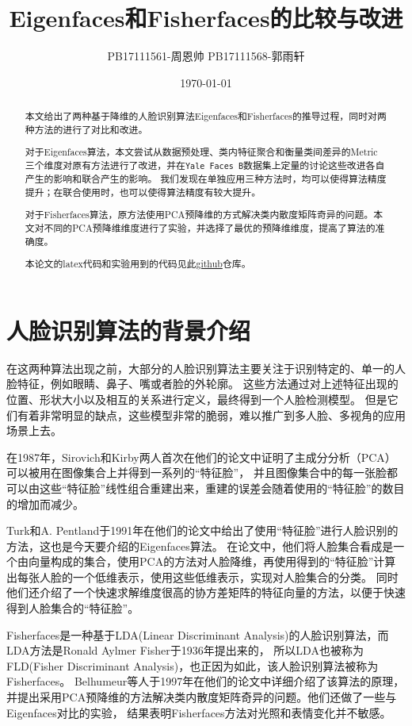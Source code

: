 \documentclass{ctexart}
\title{Eigenfaces和Fisherfaces的比较与改进}
\date{\today}
\author{PB17111561-周恩帅 PB17111568-郭雨轩}
\begin{document}
\maketitle

\begin{abstract}
    本文给出了两种基于降维的人脸识别算法Eigenfaces和Fisherfaces的推导过程，同时对两种方法的进行了对比和改进。
    
    对于Eigenfaces算法，本文尝试从数据预处理、类内特征聚合和衡量类间差异的Metric三个维度对原有方法进行了改进，并在\texttt{Yale Faces B}数据集上定量的讨论这些改进各自产生的影响和联合产生的影响。
    我们发现在单独应用三种方法时，均可以使得算法精度提升；在联合使用时，也可以使得算法精度有较大提升。
    
    对于Fisherfaces算法，原方法使用PCA预降维的方式解决类内散度矩阵奇异的问题。本文对不同的PCA预降维维度进行了实验，并选择了最优的预降维维度，提高了算法的准确度。
    
    本论文的latex代码和实验用到的代码见此\href{https://github.com/SkilfulBugsMaker/Analysis-of-Eigenface-and-Fisherface}{github}仓库。
\end{abstract}

\tableofcontents
\newpage


\section{人脸识别算法的背景介绍}
在这两种算法出现之前，大部分的人脸识别算法主要关注于识别特定的、单一的人脸特征，例如眼睛、鼻子、嘴或者脸的外轮廓。
这些方法通过对上述特征出现的位置、形状大小以及相互的关系进行定义，最终得到一个人脸检测模型。
但是它们有着非常明显的缺点，这些模型非常的脆弱，难以推广到多人脸、多视角的应用场景上去。

在1987年，Sirovich和Kirby两人首次在他们的论文\cite{Sirovich:87}中证明了主成分分析（PCA）可以被用在图像集合上并得到一系列的“特征脸”，
并且图像集合中的每一张脸都可以由这些“特征脸”线性组合重建出来，重建的误差会随着使用的“特征脸”的数目的增加而减少。

Turk和A. Pentland于1991年在他们的论文\cite{doi:10.1162/jocn.1991.3.1.71}中给出了使用“特征脸”进行人脸识别的方法，这也是今天要介绍的Eigenfaces算法。
在论文中，他们将人脸集合看成是一个由向量构成的集合，使用PCA的方法对人脸降维，再使用得到的“特征脸”计算出每张人脸的一个低维表示，使用这些低维表示，实现对人脸集合的分类。
同时他们还介绍了一个快速求解维度很高的协方差矩阵的特征向量的方法，以便于快速得到人脸集合的“特征脸”。

Fisherfaces是一种基于LDA(Linear Discriminant Analysis)的人脸识别算法，而LDA方法是Ronald Aylmer Fisher于1936年提出来的，
所以LDA也被称为FLD(Fisher Discriminant Analysis)，也正因为如此，该人脸识别算法被称为Fisherfaces。
Belhumeur等人于1997年在他们的论文\cite{Belhumeur1997Eigenfaces}中详细介绍了该算法的原理，
并提出采用PCA预降维的方法解决类内散度矩阵奇异的问题。他们还做了一些与Eigenfaces对比的实验，
结果表明Fisherfaces方法对光照和表情变化并不敏感。
\end{document}

